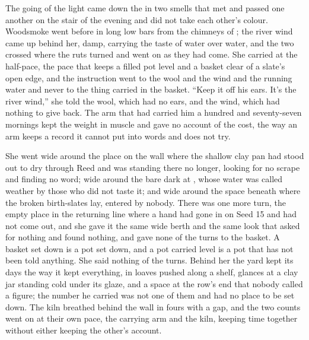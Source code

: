
The going of the light came down the  in two smells that met and passed one another on the stair of the evening and did not take each other's colour. Woodsmoke went before  in long low bars from the chimneys of ; the river wind came up behind her, damp, carrying the taste of water over water, and the two crossed where the ruts turned and went on as they had come. She carried  at the half-pace, the pace that keeps a filled pot level and a basket clear of a slate's open edge, and the instruction went to the wool and the wind and the running water and never to the thing carried in the basket. “Keep it off his ears. It's the river wind,” she told the wool, which had no ears, and the wind, which had nothing to give back. The arm that had carried him a hundred and seventy-seven mornings kept the weight in muscle and gave no account of the cost, the way an arm keeps a record it cannot put into words and does not try.

She went wide around the place on the wall where the shallow clay pan had stood out to dry through Reed and was standing there no longer, looking for no scrape and finding no word; wide around the bare dark  at , whose water was called weather by those who did not taste it; and wide around the space beneath  where the broken birth-slates lay, entered by nobody. There was one more turn, the empty place in the returning line where a hand had gone in on Seed 15 and had not come out, and she gave it the same wide berth and the same look that asked for nothing and found nothing, and gave none of the turns to the basket. A basket set down is a pot set down, and a pot carried level is a pot that has not been told anything. She said nothing of the turns. Behind her the yard kept its days the way it kept everything, in loaves pushed along a shelf, glances at a clay jar standing cold under its glaze, and a space at the row's end that nobody called a figure; the number he carried was not one of them and had no place to be set down. The kiln breathed behind the wall in fours with a gap, and the two counts went on at their own pace, the carrying arm and the kiln, keeping time together without either keeping the other's account.

